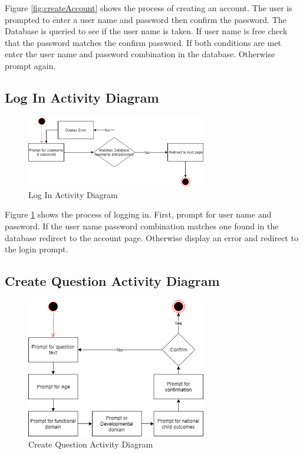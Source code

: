 Figure \ref{fig:createAccount} shows the process of creating an account. The user is prompted to enter a user name and password then confirm the password. The Database is queried to see if the user name is taken. If user name is free check that the password matches the confirm password. If both conditions are met enter the user name and password combination in the database. Otherwise prompt again.

\subsection{Log In Activity Diagram}

\begin{figure}[h]
  \centering
  \includegraphics[width=0.7\textwidth]{images/Log_In_Activity_Diagram.png}
  \caption{Log In Activity Diagram}
  \label{fig:logIn}
\end{figure}

Figure \ref{fig:logIn} shows the process of logging in. First, prompt for user name and password. If the user name password combination matches one found in the database redirect to the account page. Otherwise display an error and redirect to the login prompt.

\subsection{Create Question Activity Diagram}

\begin{figure}[h]
  \centering
  \includegraphics[width=0.7\textwidth]{images/Create_Question_Activity_Diagram.png}
  \caption{Create Question Activity Diagram}
  \label{fig:createQuestion}
\end{figure}

